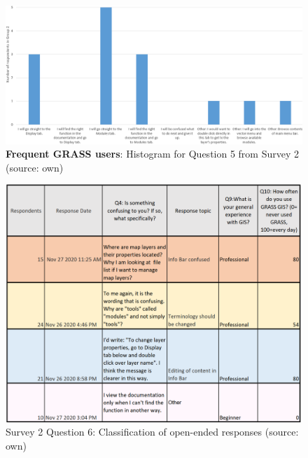 \documentclass[a4paper,10pt,twoside]{article}
\begin{document}
\newpage
\begin{figure}[hbt!] 
\begin{center}
\includegraphics[width=17cm]{../surveys/analyzed_data/survey2_question5_histogram_group2.png} 
\caption[\textbf{Frequent GRASS users}: Histogram for Question 5 from Survey 2]{\textbf{Frequent GRASS users}: Histogram for Question 5 from Survey 2 (source: own)}
\label{fig:survey2_question5_histogram_group2}
\end{center}
\end{figure}

\begin{figure}[hbt!] 
\begin{center}
\includegraphics[width=14.5cm]{../surveys/analyzed_data/survey2_question6.png} 
\caption[Survey 2 Question 6: Classification of open-ended responses]{Survey 2 Question 6: Classification of open-ended responses (source: own)}
\label{fig:survey2_question6}
\end{center}
\end{figure}
\end{document}
